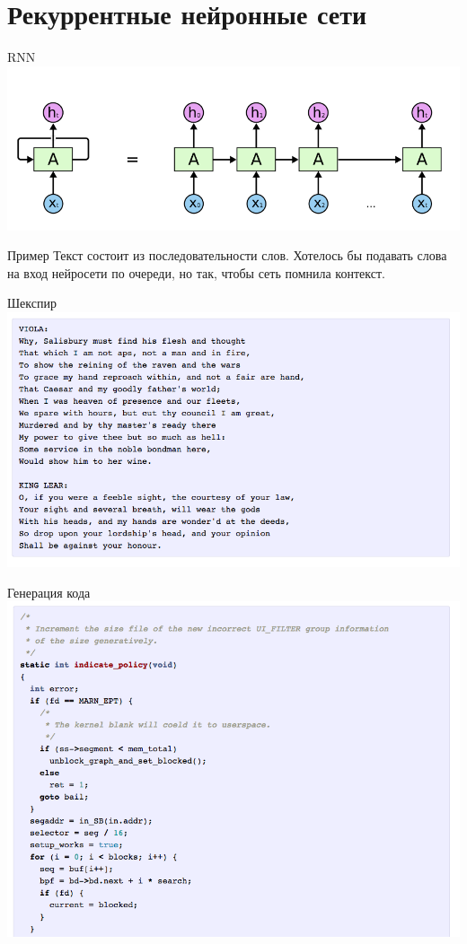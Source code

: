 \documentclass[10pt]{beamer}
\begin{document}
\section{Рекуррентные нейронные сети}

\begin{frame}{RNN}
  \centering
  \includegraphics[width=0.9 \textwidth, keepaspectratio = true]{images/RNN}   
\end{frame}

\begin{frame}{Пример}
  Текст состоит из последовательности слов. Хотелось бы подавать слова на вход нейросети по очереди, но так, чтобы сеть помнила контекст.
\end{frame}

{
\begin{frame}{Шекспир}
  \centering
  \includegraphics[width=0.9 \textwidth, keepaspectratio = true]{images/shakespeare}   
\end{frame}
}

{
\begin{frame}{Генерация кода}
  \centering 
  \includegraphics[width=0.9 \textwidth, keepaspectratio = true]{images/code}   
\end{frame}
}
\end{document}

